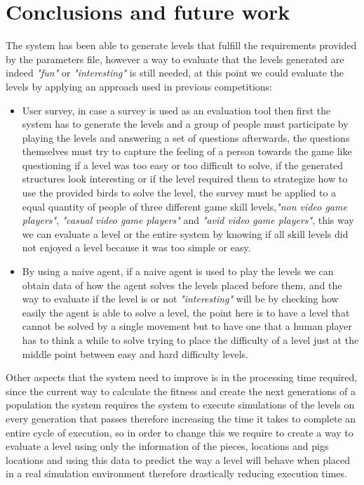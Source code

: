 \documentclass[conference]{IEEEtran}
\begin{document}
    \section{Conclusions and future work}
    
     The system has been able to generate levels that fulfill the requirements
     provided by the parameters file, however a way to evaluate that the levels
     generated are indeed \textit{"fun"} or \textit{"interesting"} is still
     needed, at this point we could evaluate the levels by applying an approach
     used in previous competitions:
     \begin{itemize}
        \item User survey, in case a survey is used as an evaluation tool then first
        the system has to generate the levels and a group of people must participate
        by playing the levels and answering a set of questions afterwards, the
        questions themselves must try to capture the feeling of a person towards the
        game like questioning if a level was too easy or too difficult to solve, if
        the generated structures look interesting or if the level required them to
        strategize how to use the provided birds to solve the level, the survey must
        be applied to a equal quantity of people of three different game skill
        levels,\textit{"non video game players"}, \textit{"casual video game
        players"} and \textit{"avid video game players"}, this way we can evaluate a
        level or the entire system by knowing if all skill levels did not enjoyed a
        level because it was too simple or easy.
        \item By using a naive agent, if a naive agent is used to play the levels we
        can obtain data of how the agent solves the levels placed before them, and
        the way to evaluate if the level is or not \textit{"interesting"} will be by
        checking how easily the agent is able to solve a level, the point here is
        to have a level that cannot be solved by a single movement but to have one
        that a human player has to think a while to solve trying to place the
        difficulty of a level just at the middle point between easy and hard
        difficulty levels.
    \end{itemize}
        
    Other aspects that the system need to improve is in the processing time
    required, since the current way to calculate the fitness and create the next
    generations of a population the system requires the system to execute
    simulations of the levels on every generation that passes therefore increasing
    the time it takes to complete an entire cycle of execution, so in order to
    change this we require to create a way to evaluate a level using only the
    information of the pieces, locations and pigs locations and using this data to
    predict the way a level will behave when placed in a real simulation environment
    therefore drastically reducing execution times.
\end{document}
